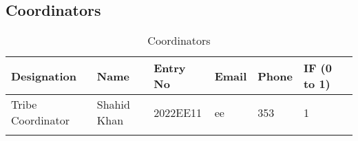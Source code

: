 \documentclass[a4paper,12pt]{article}
\begin{document}
\subsection{Coordinators}
\begin{longtable}[c]{|l|l|l|l|l|l|l|}
\hline
\textbf{Designation} & \textbf{Name} & \textbf{Entry No} & \textbf{Email} & \textbf{Phone} & \textbf{IF (0 to 1)} \\
\hline
Tribe Coordinator & Shahid Khan & 2022EE11 & ee & 353 & 1 \\
\hline

\caption{Coordinators}

\end{longtable}
\end{document}
